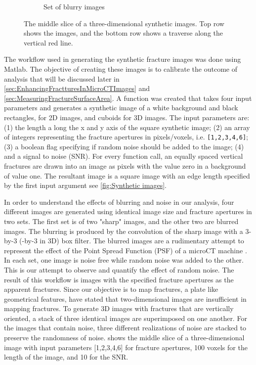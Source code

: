 \documentclass{edger}
\begin{document}
\begin{figure}[!h]
\begin{subfigure}[b]{0.5\textwidth}
            \caption{Set of blurry images}
            \label{fig:Blurry images}
    \end{subfigure}
    \caption{The middle slice of a three-dimensional synthetic images. Top row shows the images, and the bottom row shows a traverse along the vertical red line. }
    \label{fig:Synthetic images}
\end{figure}

The workflow used in generating the synthetic fracture images was done using Matlab. The objective of creating these images is to calibrate the outcome of analysis that will be discussed later in \autoref{sec:EnhancingFractturesInMicroCTImages} and \autoref{sec:MeasuringFractureSurfaceArea}. A function was created that takes four input parameters and generates a synthetic image of a white background and black rectangles, for 2D images, and cuboids for 3D images. The input parameters are: (1) the length a long the x and y axis of the square synthetic image; (2) an array of integers representing the fracture apertures in pixels/voxels, i.e. \texttt{[1,2,3,4,6]}; (3) a boolean flag specifying if random noise should be added to the image; (4) and a signal to noise (SNR). For every function call, an equally spaced vertical fractures are drawn into an image as pixels with the value zero in a background of value one. The resultant image is a square image with an edge length specified by the first input argument see \autoref{fig:Synthetic images}. 

In order to understand the effects of blurring and noise in our analysis, four different images are generated using identical image size and fracture apertures in two sets. The first set is of two "sharp" images, and the other two are blurred images. The blurring is produced by the convolution of the sharp image with a 3-by-3 (-by-3 in 3D) box filter. The blurred images are a rudimentary attempt to represent the effect of the Point Spread Function (PSF) of a microCT machine \citep{Ketcham2010}. In each set, one image is noise free while random noise was added to the other. This is our attempt to observe and quantify the effect of random noise. The result of this workflow is images with the specified fracture apertures as the apparent fractures. Since our objective is to map fractures, a plate like geometrical features, \cite{Voorn2013} have stated that two-dimensional images are insufficient in mapping fractures.  To generate 3D images with fractures that are vertically oriented, a stack of three identical images are superimposed on one another. For the images that contain noise, three different realizations of noise are stacked to preserve the randomness of noise.  shows the middle slice of a three-dimensional image with input parameters [1,2,3,4,6] for fracture apertures, 100 voxels for the length of the image, and 10 for the SNR. 
\end{document}
